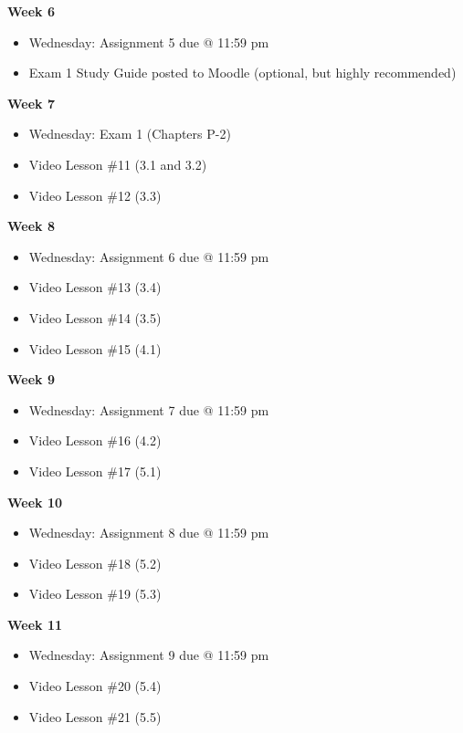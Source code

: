\documentclass[12pt]{letter}
\newcommand{\?}{\stackrel{?}{=}}
\begin{document}
	\textbf{Week 6} \begin{itemize} \vspace{-12pt}
		\item Wednesday: Assignment 5 due @ 11:59 pm
		\item Exam 1 Study Guide posted to Moodle (optional, but highly recommended)
	\end{itemize}

	\textbf{Week 7} \begin{itemize} \vspace{-12pt}
		\item Wednesday: Exam 1 (Chapters P-2)
		\item Video Lesson \#11 (3.1 and 3.2)
		\item Video Lesson \#12 (3.3)
	\end{itemize}

	\textbf{Week 8} \begin{itemize} \vspace{-12pt}
		\item Wednesday: Assignment 6 due @ 11:59 pm
		\item Video Lesson \#13 (3.4)
		\item Video Lesson \#14 (3.5)
		\item Video Lesson \#15 (4.1)
	\end{itemize}

	\textbf{Week 9} \begin{itemize}
		\item Wednesday: Assignment 7 due @ 11:59 pm
		\item Video Lesson \#16 (4.2)
		\item Video Lesson \#17 (5.1)
	\end{itemize}

	\textbf{Week 10} \begin{itemize} \vspace{-12pt}
		\item Wednesday: Assignment 8 due @ 11:59 pm
		\item Video Lesson \#18 (5.2)
		\item Video Lesson \#19 (5.3)
	\end{itemize}

	\textbf{Week 11} \begin{itemize} \vspace{-12pt}
		\item Wednesday: Assignment 9 due @ 11:59 pm
		\item Video Lesson \#20 (5.4)
		\item Video Lesson \#21 (5.5)
	\end{itemize}
\end{document}
